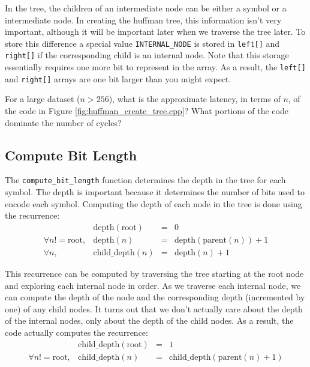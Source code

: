 In the tree, the children of an intermediate node can be either a symbol or a intermediate node.  In creating the huffman tree, this information isn't very important, although it will be important later when we traverse the tree later.  To store this difference
a special value \lstinline{INTERNAL_NODE} is stored in \lstinline{left[]} and \lstinline{right[]} if the corresponding child is an internal node.   Note that this storage essentially requires one more bit to represent in the array.  As a result, the \lstinline{left[]} and \lstinline{right[]} arrays are one bit larger than you might expect. 



\begin{exercise}
For a large dataset ($n > 256$), what is the approximate latency, in terms of $n$, of the code in Figure \ref{fig:huffman_create_tree.cpp}?  What portions of the code dominate the number of cycles?
\end{exercise}

\subsection{Compute Bit Length}

The \lstinline{compute_bit_length} function determines the depth in the tree for each symbol.  The depth is important because it determines the number of bits used to encode each symbol. Computing the depth of each node in the tree is done using the recurrence:
\begin{equation}
\begin{array}{rrcl}
&\mathrm{depth}(\mathrm{root}) &=& 0 \\
\forall n != \mathrm{root}, &\mathrm{depth}(n) &=& \mathrm{depth}(\mathrm{parent}(n))+1\\
\forall n, &\mathrm{child\_depth}(n) &=& \mathrm{depth}(n)+1
\end{array}
\end{equation}

This recurrence can be computed by traversing the tree starting at the root node and exploring each internal node in order.  As we traverse each internal node, we can compute the depth of the node and the corresponding depth (incremented by one) of any child nodes.  It turns out that we don't actually care about the depth of the internal nodes, only about the depth of the child nodes.  As a result, the code actually computes the recurrence:
\begin{equation}
\begin{array}{rrcl}
&\mathrm{child\_depth}(\mathrm{root}) &=& 1 \\
\forall n != \mathrm{root}, &\mathrm{child\_depth}(n) &=& \mathrm{child\_depth}(\mathrm{parent}(n)+1)
\end{array}
\end{equation}

